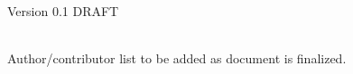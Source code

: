 
\thispagestyle{empty}%
{\noindent Version 0.1 DRAFT}
\vspace*{\fill}
\begin{fullwidth}
\sffamily
{
  \huge
  \smallcaps
  \@title
}\\
\vspace{4\baselineskip}
{\Large 
\noindent
% 
Author/contributor list to be added as document is finalized.
}\\
\vspace{4\baselineskip}
\noindent
\@date\\
\vspace{\baselineskip}
\end{fullwidth}
\vspace*{\fill}
